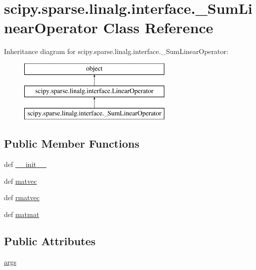\hypertarget{classscipy_1_1sparse_1_1linalg_1_1interface_1_1__SumLinearOperator}{}\section{scipy.\+sparse.\+linalg.\+interface.\+\_\+\+Sum\+Linear\+Operator Class Reference}
\label{classscipy_1_1sparse_1_1linalg_1_1interface_1_1__SumLinearOperator}
Inheritance diagram for scipy.\+sparse.\+linalg.\+interface.\+\_\+\+Sum\+Linear\+Operator\+:\begin{figure}[H]
\begin{center}
\leavevmode
\includegraphics[height=3.000000cm]{classscipy_1_1sparse_1_1linalg_1_1interface_1_1__SumLinearOperator}
\end{center}
\end{figure}
\subsection*{Public Member Functions}
\begin{DoxyCompactItemize}
\item 
def \hyperlink{classscipy_1_1sparse_1_1linalg_1_1interface_1_1__SumLinearOperator_adb57805cd9206045d55cf3ba1ba38ab7}{\+\_\+\+\_\+init\+\_\+\+\_\+}
\item 
def \hyperlink{classscipy_1_1sparse_1_1linalg_1_1interface_1_1__SumLinearOperator_abf5c9ccdee98dd4573be8015b4f62daf}{matvec}
\item 
def \hyperlink{classscipy_1_1sparse_1_1linalg_1_1interface_1_1__SumLinearOperator_ad661fe41a1b278fdbeba4c5ed9643e6a}{rmatvec}
\item 
def \hyperlink{classscipy_1_1sparse_1_1linalg_1_1interface_1_1__SumLinearOperator_a2e6a619c2d578d2a16420f929bee44ee}{matmat}
\end{DoxyCompactItemize}
\subsection*{Public Attributes}
\begin{DoxyCompactItemize}
\item 
\hyperlink{classscipy_1_1sparse_1_1linalg_1_1interface_1_1__SumLinearOperator_a9615d2f89cc17994be1dfc51366f32d5}{args}
\end{DoxyCompactItemize}


